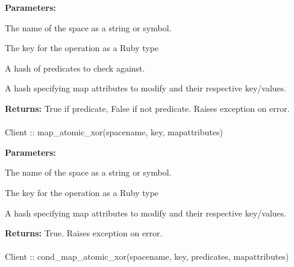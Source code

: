 \noindent\textbf{Parameters:}
\begin{description}[labelindent=\widthof{{\code{mapattributes}}},leftmargin=*,noitemsep,nolistsep,align=right]
\item[\code{spacename}] The name of the space as a string or symbol.
\item[\code{key}] The key for the operation as a Ruby type
\item[\code{predicates}] A hash of predicates to check against.
\item[\code{mapattributes}] A hash specifying map attributes to modify and their respective key/values.
\end{description}

\noindent\textbf{Returns:}
True if predicate, False if not predicate.  Raises exception on error.

\paragraph{}
\label{api:ruby:map_atomic_xor}
\begin{rubycode}
Client :: map_atomic_xor(spacename, key, mapattributes)
\end{rubycode}


\noindent\textbf{Parameters:}
\begin{description}[labelindent=\widthof{{\code{mapattributes}}},leftmargin=*,noitemsep,nolistsep,align=right]
\item[\code{spacename}] The name of the space as a string or symbol.
\item[\code{key}] The key for the operation as a Ruby type
\item[\code{mapattributes}] A hash specifying map attributes to modify and their respective key/values.
\end{description}

\noindent\textbf{Returns:}
True.  Raises exception on error.

\paragraph{}
\label{api:ruby:cond_map_atomic_xor}
\begin{rubycode}
Client :: cond_map_atomic_xor(spacename, key, predicates, mapattributes)
\end{rubycode}


